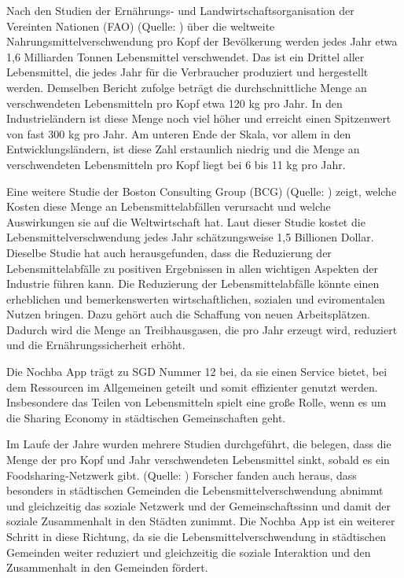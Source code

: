 Nach den Studien der Ernährungs- und Landwirtschaftsorganisation der Vereinten Nationen (FAO) (Quelle: \cite{bcg2018foodloss} ) über die weltweite Nahrungsmittelverschwendung pro Kopf der Bevölkerung werden jedes Jahr etwa 1,6 Milliarden Tonnen Lebensmittel verschwendet. Das ist ein Drittel aller Lebensmittel, die jedes Jahr für die Verbraucher produziert und hergestellt werden. Demselben Bericht zufolge beträgt die durchschnittliche Menge an verschwendeten Lebensmitteln pro Kopf etwa 120 kg pro Jahr. In den Industrieländern ist diese Menge noch viel höher und erreicht einen Spitzenwert von fast 300 kg pro Jahr. Am unteren Ende der Skala, vor allem in den Entwicklungsländern, ist diese Zahl erstaunlich niedrig und die Menge an verschwendeten Lebensmitteln pro Kopf liegt bei 6 bis 11 kg pro Jahr.

Eine weitere Studie der Boston Consulting Group (BCG) (Quelle: \cite{bcg2022foodwaste} ) zeigt, welche Kosten diese Menge an Lebensmittelabfällen verursacht und welche Auswirkungen sie auf die Weltwirtschaft hat. Laut dieser Studie kostet die Lebensmittelverschwendung jedes Jahr schätzungsweise 1,5 Billionen Dollar. Dieselbe Studie hat auch herausgefunden, dass die Reduzierung der Lebensmittelabfälle zu positiven Ergebnissen in allen wichtigen Aspekten der Industrie führen kann. Die Reduzierung der Lebensmittelabfälle könnte einen erheblichen und bemerkenswerten wirtschaftlichen, sozialen und eviromentalen Nutzen bringen. Dazu gehört auch die Schaffung von neuen Arbeitsplätzen. Dadurch wird die Menge an Treibhausgasen, die pro Jahr erzeugt wird, reduziert und die Ernährungssicherheit erhöht.

Die Nochba App trägt zu SGD Nummer 12 bei, da sie einen Service bietet, bei dem Ressourcen im Allgemeinen geteilt und somit effizienter genutzt werden. Insbesondere das Teilen von Lebensmitteln spielt eine große Rolle, wenn es um die Sharing Economy in städtischen Gemeinschaften geht.

Im Laufe der Jahre wurden mehrere Studien durchgeführt, die belegen, dass die Menge der pro Kopf und Jahr verschwendeten Lebensmittel sinkt, sobald es ein Foodsharing-Netzwerk gibt. (Quelle: \cite{parizeau2015food} ) Forscher fanden auch heraus, dass besonders in städtischen Gemeinden die Lebensmittelverschwendung abnimmt und gleichzeitig das soziale Netzwerk und der Gemeinschaftssinn und damit der soziale Zusammenhalt in den Städten zunimmt.  Die Nochba App ist ein weiterer Schritt in diese Richtung, da sie die Lebensmittelverschwendung in städtischen Gemeinden weiter reduziert und gleichzeitig die soziale Interaktion und den Zusammenhalt in den Gemeinden fördert.


